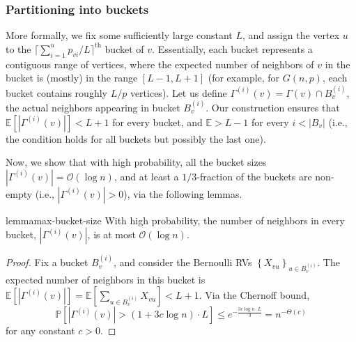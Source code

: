 \subsubsection{Partitioning into buckets}
\label{sec:bucket_partition}
More formally, we fix some sufficiently large constant $L$,
and assign the vertex $u$ to the $\lceil\sum^{u}_{i=1} p_{vi}/L\rceil^\textrm{th}$ bucket of $v$.
Essentially, each bucket represents a contiguous range of vertices,
where the expected number of neighbors of $v$ in the bucket is (mostly) in the range $[L-1,L+1]$
(for example, for $G(n,p)$, each bucket contains roughly $L/p$ vertices).
Let us define $\Gamma^{(i)}(v) = \Gamma(v) \cap B_v^{(i)}$,
the actual neighbors appearing in bucket $B^{(i)}_v$.
Our construction ensures that $\mathbb E \left[|\Gamma^{(i)}(v)|\right] < L+1$ for every bucket,
and $\mathbb E > L-1$ for every $i < |B_v|$
(i.e., the condition holds for all buckets but possibly the last one).

Now, we show that with high probability, all the bucket sizes $|\Gamma^{(i)}(v)|=\mathcal{O}(\log n)$, and at least a $1/3$-fraction of the buckets are non-empty (i.e., $|\Gamma^{(i)}(v)|>0$), via the following lemmas.

\begin{restatable}{lemma}{max-bucket-size}
\label{lem:max_bucket_size}
With high probability, the number of neighbors in every bucket, $|\Gamma^{(i)}(v)|$, is at most $ \mathcal{O}(\log n)$.
\end{restatable}
\begin{proof}
Fix a bucket $B_v^{(i)}$, and consider the Bernoulli RVs $\left\{ X_{vu}\right\}_{u\in B_v^{(i)}}$.
The expected number of neighbors in this bucket is
$ \textstyle\mathbb{E} \left[ |\Gamma^{(i)}(v)| \right] =\mathbb{E} \left[ \sum_{u\in B_v^{(i)}} X_{vu} \right] < L+1$.
Via the Chernoff bound,
\[
\mathbb{P} \left[ |\Gamma^{(i)}(v)|> (1+3c\log n)\cdot L \right]
\le e^{-\frac{3c\log n\cdot L}{3}} = n^{-\Theta(c)}
\]
for any constant $c > 0$.
\end{proof}

